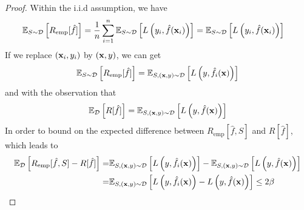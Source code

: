 \begin{proof}
	Within the i.i.d assumption, we have
	\begin{equation}
		\begin{aligned}
			{\mathbb E}_{S\sim\mathcal{D}}\left[R_{\text{emp}}[\hat{f}]\right] & =\frac{1}{n}\sum_{i=1}^{n}{\mathbb E}_{S\sim\mathcal{D}}\left[L\left(y_{i},\hat{f}({\bf x}_{i})\right)\right]={\mathbb E}_{S\sim\mathcal{D}}\left[L\left(y_{i},\hat{f}({\bf x}_{i})\right)\right]
		\end{aligned}
	\end{equation}
	If we replace $({\bf x}_{i},y_{i})$ by $({\bf x},y)$, we can get
	\begin{equation}
		{\mathbb E}_{S\sim\mathcal{D}}\left[R_{\text{emp}}[\hat{f}]\right]={\mathbb E}_{S,\left({\bf x},y\right)\sim\mathcal{D}}\left[L\left(y,\hat{f}_{i}({\bf x})\right)\right]
	\end{equation}
	and with the observation that
	\begin{equation}
		{\mathbb E}_{\mathcal{D}}\left[R[\hat{f}]\right]={\mathbb E}_{S,\left({\bf x},y\right)\sim\mathcal{D}}\left[L\left(y,\hat{f}({\bf x})\right)\right]
	\end{equation}
	In order to bound on the expected difference between $R_{\text{emp}}[\hat{f},S]$ and $R[\hat{f}]$, which leads to
	\begin{equation}
		\begin{aligned}
			{\mathbb E}_{\mathcal{D}}\left[R_{\text{emp}}[\hat{f},S]-R[\hat{f}]\right]= & {\mathbb E}_{S,\left({\bf x},y\right)\sim\mathcal{D}}\left[L\left(y,\hat{f}_{i}({\bf x})\right)\right]-{\mathbb E}_{S,\left({\bf x},y\right)\sim\mathcal{D}}\left[L\left(y,\hat{f}({\bf x})\right)\right] \\
			=                                                                    & {\mathbb E}_{S,\left({\bf x},y\right)\sim\mathcal{D}}\left[L\left(y,\hat{f}_{i}({\bf x})\right)-L\left(y,\hat{f}({\bf x})\right)\right]\leq 2\beta
		\end{aligned}
	\end{equation}


\end{proof}

